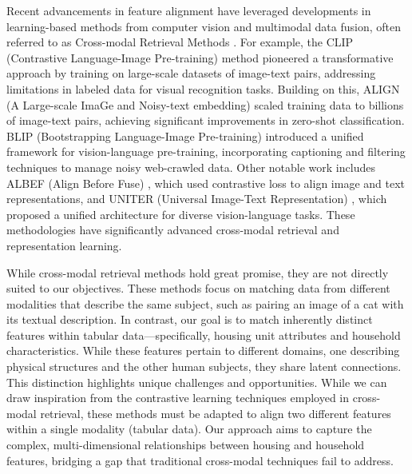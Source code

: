 \documentclass[]{nature_mod}
\begin{document}
Recent advancements in feature alignment have leveraged developments in learning-based methods from computer vision and multimodal data fusion, often referred to as Cross-modal Retrieval Methods \cite{cao2022image}. For example, the CLIP (Contrastive Language-Image Pre-training) method \cite{radford2021learning} pioneered a transformative approach by training on large-scale datasets of image-text pairs, addressing limitations in labeled data for visual recognition tasks. Building on this, ALIGN (A Large-scale ImaGe and Noisy-text embedding) \cite{jia2021scaling} scaled training data to billions of image-text pairs, achieving significant improvements in zero-shot classification. BLIP (Bootstrapping Language-Image Pre-training) \cite{li2022blip} introduced a unified framework for vision-language pre-training, incorporating captioning and filtering techniques to manage noisy web-crawled data. Other notable work includes ALBEF (Align Before Fuse) \cite{li2021align}, which used contrastive loss to align image and text representations, and UNITER (Universal Image-Text Representation) \cite{chen2020uniter}, which proposed a unified architecture for diverse vision-language tasks. These methodologies have significantly advanced cross-modal retrieval and representation learning. 

While cross-modal retrieval methods hold great promise, they are not directly suited to our objectives. These methods focus on matching data from different modalities that describe the same subject, such as pairing an image of a cat with its textual description. In contrast, our goal is to match inherently distinct features within tabular data—specifically, housing unit attributes and household characteristics. While these features pertain to different domains, one describing physical structures and the other human subjects, they share latent connections. This distinction highlights unique challenges and opportunities. While we can draw inspiration from the contrastive learning techniques employed in cross-modal retrieval, these methods must be adapted to align two different features within a single modality (tabular data). Our approach aims to capture the complex, multi-dimensional relationships between housing and household features, bridging a gap that traditional cross-modal techniques fail to address.
\end{document}
